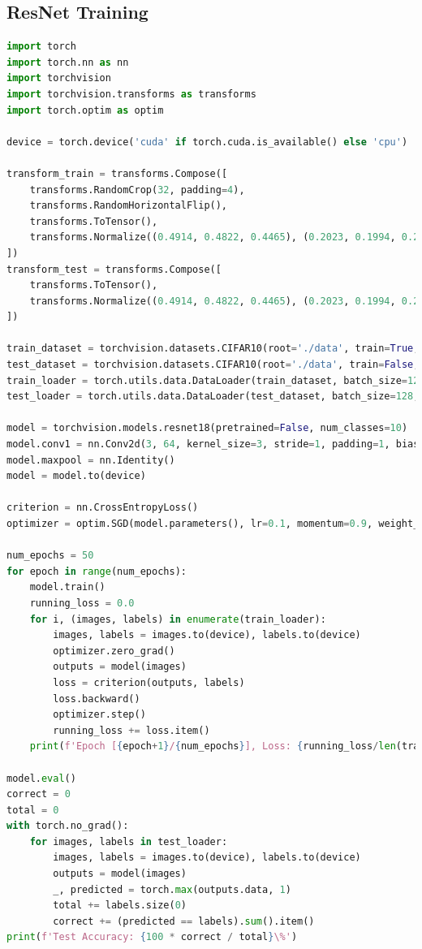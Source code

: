 \documentclass[UTF8]{report}
\theoremstyle{MyLineTheoremStyle} %
\theoremstyle{MyBlockTheoremStyle} %
\theoremstyle{MySubsubsectionStyle} %
\begin{document}
\subsection*{ResNet Training}
\begin{lstlisting}[language=Python]
import torch
import torch.nn as nn
import torchvision
import torchvision.transforms as transforms
import torch.optim as optim

device = torch.device('cuda' if torch.cuda.is_available() else 'cpu')

transform_train = transforms.Compose([
    transforms.RandomCrop(32, padding=4),
    transforms.RandomHorizontalFlip(),
    transforms.ToTensor(),
    transforms.Normalize((0.4914, 0.4822, 0.4465), (0.2023, 0.1994, 0.2010))
])
transform_test = transforms.Compose([
    transforms.ToTensor(),
    transforms.Normalize((0.4914, 0.4822, 0.4465), (0.2023, 0.1994, 0.2010))
])

train_dataset = torchvision.datasets.CIFAR10(root='./data', train=True, download=True, transform=transform_train)
test_dataset = torchvision.datasets.CIFAR10(root='./data', train=False, download=True, transform=transform_test)
train_loader = torch.utils.data.DataLoader(train_dataset, batch_size=128, shuffle=True)
test_loader = torch.utils.data.DataLoader(test_dataset, batch_size=128, shuffle=False)

model = torchvision.models.resnet18(pretrained=False, num_classes=10)
model.conv1 = nn.Conv2d(3, 64, kernel_size=3, stride=1, padding=1, bias=False)
model.maxpool = nn.Identity()
model = model.to(device)

criterion = nn.CrossEntropyLoss()
optimizer = optim.SGD(model.parameters(), lr=0.1, momentum=0.9, weight_decay=1e-4)

num_epochs = 50
for epoch in range(num_epochs):
    model.train()
    running_loss = 0.0
    for i, (images, labels) in enumerate(train_loader):
        images, labels = images.to(device), labels.to(device)
        optimizer.zero_grad()
        outputs = model(images)
        loss = criterion(outputs, labels)
        loss.backward()
        optimizer.step()
        running_loss += loss.item()
    print(f'Epoch [{epoch+1}/{num_epochs}], Loss: {running_loss/len(train_loader):.4f}')

model.eval()
correct = 0
total = 0
with torch.no_grad():
    for images, labels in test_loader:
        images, labels = images.to(device), labels.to(device)
        outputs = model(images)
        _, predicted = torch.max(outputs.data, 1)
        total += labels.size(0)
        correct += (predicted == labels).sum().item()
print(f'Test Accuracy: {100 * correct / total}\%')
\end{lstlisting}
\end{document}
